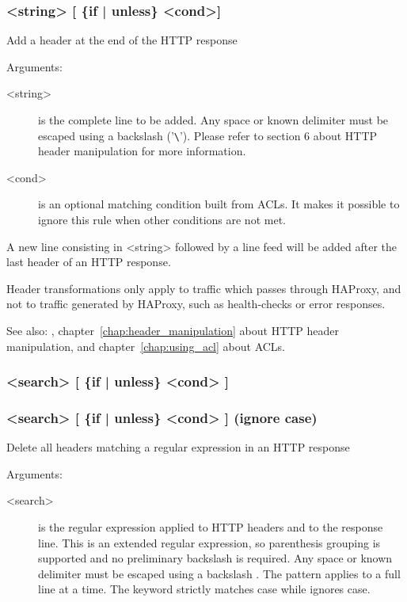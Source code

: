 {\subsubsection[rspadd]{ <string> [ \{if | unless\} <cond>] }

  Add a header at the end of the HTTP response


  Arguments:
  \begin{description}
  \item[<string>] is the complete line to be added. Any space or known delimiter
              must be escaped using a backslash ('\verb|\|'). Please refer to section
              6 about HTTP header manipulation for more information.

  \item[<cond>] is an optional matching condition built from ACLs. It makes it
              possible to ignore this rule when other conditions are not met.
  \end{description}

  A new line consisting in <string> followed by a line feed will be added after
  the last header of an HTTP response.

  Header transformations only apply to traffic which passes through HAProxy,
  and not to traffic generated by HAProxy, such as health-checks or error
  responses.

  See also: , chapter~\ref{chap:header_manipulation} about HTTP header manipulation,
  and chapter~\ref{chap:using_acl} about ACLs.

\subsubsection[rspdel]{ <search> [ \{if | unless\} <cond> ]}
\subsubsection[rspidel]{ <search> [ \{if | unless\} <cond> ]  (ignore case)}

  Delete all headers matching a regular expression in an HTTP response


  Arguments:
  \begin{description}
  \item[<search>] is the regular expression applied to HTTP headers and to the
              response line. This is an extended regular expression, so
              parenthesis grouping is supported and no preliminary backslash
              is required. Any space or known delimiter must be escaped using
              a backslash \chr{\bslash}. The pattern applies to a full line at a time.
              The  keyword strictly matches case while 
              ignores case.


\end{description}}
